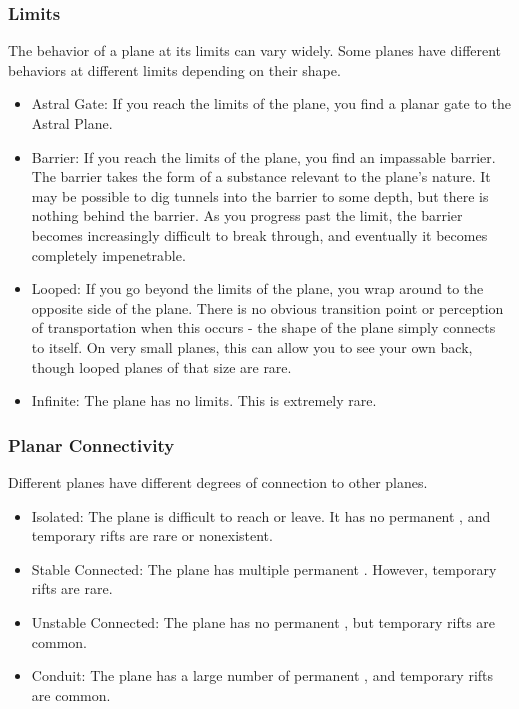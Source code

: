         \subsubsection{Limits} The behavior of a plane at its limits can vary widely.
            Some planes have different behaviors at different limits depending on their shape.
            \begin{itemize}
                \item Astral Gate: If you reach the limits of the plane, you find a planar gate to the Astral Plane.
                \item Barrier: If you reach the limits of the plane, you find an impassable barrier.
                    The barrier takes the form of a substance relevant to the plane's nature.
                    It may be possible to dig tunnels into the barrier to some depth, but there is nothing behind the barrier.
                    As you progress past the limit, the barrier becomes increasingly difficult to break through, and eventually it becomes completely impenetrable.
                \item Looped: If you go beyond the limits of the plane, you wrap around to the opposite side of the plane.
                    There is no obvious transition point or perception of transportation when this occurs - the shape of the plane simply connects to itself.
                    On very small planes, this can allow you to see your own back, though looped planes of that size are rare.
                \item Infinite: The plane has no limits. This is extremely rare.
            \end{itemize}

        \subsubsection{Planar Connectivity}
            Different planes have different degrees of connection to other planes.
            \begin{itemize}
                \item Isolated: The plane is difficult to reach or leave.
                    It has no permanent , and temporary rifts are rare or nonexistent.
                \item Stable Connected: The plane has multiple permanent .
                    However, temporary rifts are rare.
                \item Unstable Connected: The plane has no permanent , but temporary rifts are common.
                \item Conduit: The plane has a large number of permanent , and temporary rifts are common.
            \end{itemize}

